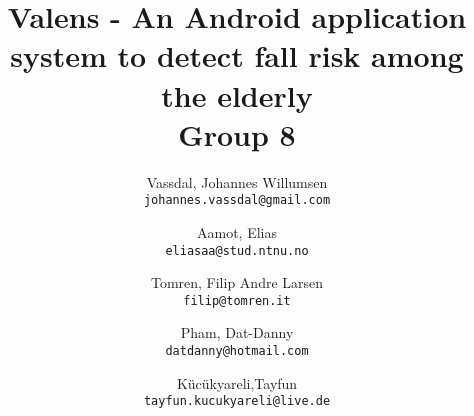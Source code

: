 \documentclass[12pt,a4paper,table]{report}
\title{Valens - An Android application system to detect fall risk among the elderly \\Group 8}
\author{
  Vassdal, Johannes Willumsen\\
  \texttt{johannes.vassdal@gmail.com}
  \and
  Aamot, Elias\\
  \texttt{eliasaa@stud.ntnu.no}
  \and
  Tomren, Filip Andre Larsen\\
  \texttt{filip@tomren.it}
    \and
  Pham, Dat-Danny\\
  \texttt{datdanny@hotmail.com}
    \and
  K\"{u}c\"{u}kyareli,Tayfun\\
  \texttt{tayfun.kucukyareli@live.de}
}
\begin{document}
\onehalfspacing
\maketitle
\tableofcontents













\end{document}
